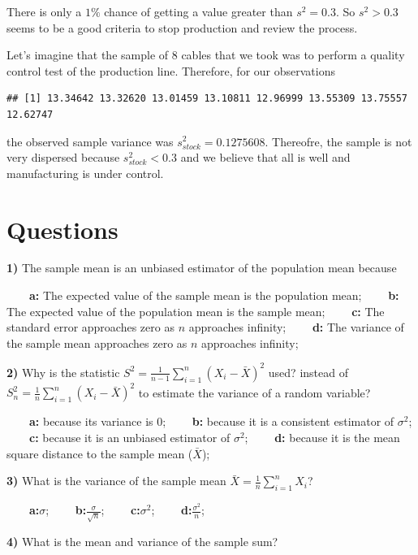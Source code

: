 \documentclass[
]{book}
\begin{document}
There is only a \(1\%\) chance of getting a value greater than \(s^2=0.3\). So \(s^2>0.3\) seems to be a good criteria to stop production and review the process.

Let's imagine that the sample of \(8\) cables that we took was to perform a quality control test of the production line. Therefore, for our observations

\begin{verbatim}
## [1] 13.34642 13.32620 13.01459 13.10811 12.96999 13.55309 13.75557 12.62747
\end{verbatim}

the observed sample variance was \(s^2_{stock}=0.1275608\). Thereofre, the sample is not very dispersed because \(s^2_{stock} < 0.3\) and we believe that all is well and manufacturing is under control.

\hypertarget{questions-7}{%
\section{Questions}\label{questions-7}}

\textbf{1)} The sample mean is an unbiased estimator of the population mean because

\textbf{\(\qquad\)a:} The expected value of the sample mean is the population mean;
\textbf{\(\qquad\)b:} The expected value of the population mean is the sample mean;
\textbf{\(\qquad\)c:} The standard error approaches zero as \(n\) approaches infinity;
\textbf{\(\qquad\)d:} The variance of the sample mean approaches zero as \(n\) approaches infinity;

\textbf{2)} Why is the statistic \(S^2=\frac{1}{n-1}\sum_{i=1}^{n}(X_i -\bar{X})^2\) used? instead of \(S_n^2=\frac{1}{n}\sum_{i=1}^{n}(X_i -\bar{X})^2\) to estimate the variance of a random variable?

\textbf{\(\qquad\)a:} because its variance is \(0\);
\textbf{\(\qquad\)b:} because it is a consistent estimator of \(\sigma^2\);
\textbf{\(\qquad\)c:} because it is an unbiased estimator of \(\sigma^2\);
\textbf{\(\qquad\)d:} because it is the mean square distance to the sample mean (\(\bar{X}\));

\textbf{3)} What is the variance of the sample mean \(\bar{X}=\frac{1}{n}\sum_{i=1}^n X_i\)?

\textbf{\(\qquad\)a:}\(\sigma\);
\textbf{\(\qquad\)b:}\(\frac{\sigma}{\sqrt{n}}\);
\textbf{\(\qquad\)c:}\(\sigma^2\);
\textbf{\(\qquad\)d:}\(\frac{\sigma^2}{n}\);

\textbf{4)} What is the mean and variance of the sample sum?
\end{document}
